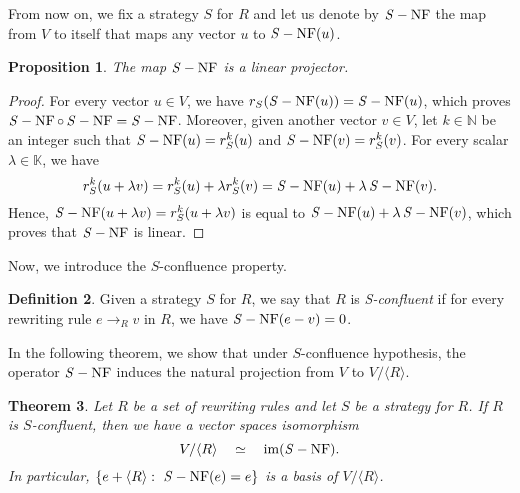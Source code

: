 \documentclass[11pt]{article}
\newtheorem{theorem}{Theorem}[section]
\newtheorem{proposition}[theorem]{Proposition}
\theoremstyle{definition}
\newtheorem{definition}[theorem]{Definition}
\newcommand\K{\mathbb{K}}
\newcommand\N{\mathbb{N}}
\newcommand\Span[1]{\langle #1\rangle}
\DeclareMathOperator{\im}{im}
\newcommand\rewR{\to_R}
\DeclareMathOperator{\SNF}{{\it S}-NF}
\begin{document}
From now on, we fix a strategy $S$ for $R$ and let us denote by $\SNF$
the map from $V$ to itself that maps any vector $u$ to $\SNF(u)$.
\smallskip

\begin{proposition}\label{prop:SNF_projector}
  The map $\SNF$ is a linear projector.
\end{proposition}

\begin{proof}
  For every vector $u\in V$, we have $r_S(\SNF(u))=\SNF(u)$, which proves 
  $\SNF\circ\SNF=\SNF$. Moreover, given another vector $v\in V$, let
  $k\in\N$ be an integer such that $\SNF(u)=r_S^k(u)$ and
  $\SNF(v)=r_S^k(v)$. For every scalar $\lambda\in\K$, we have 
  \[r^k_S(u+\lambda v)=r^k_S(u)+\lambda r^k_S(v)=\SNF(u)+\lambda\SNF(v).
  \]
  Hence, $\SNF(u+\lambda v)=r^k_S(u+\lambda v)$ is equal to
  $\SNF(u)+\lambda\SNF(v)$, which proves that $\SNF$ is linear.
\end{proof}

\smallskip

Now, we introduce the $S$-confluence property. 
\smallskip

\begin{definition}\label{def:standardisation_property}
  Given a strategy $S$ for $R$, we say that $R$ is \emph{S-confluent} if
  for every rewriting rule $e\rewR v$ in $R$, we have $\SNF(e-v)=0$.
\end{definition}
\smallskip

In the following theorem, we show that under $S$-confluence hypothesis,
the operator $\SNF$ induces the natural projection from $V$ to
$V/\Span{R}$.
\medskip

\begin{theorem}\label{thm:SNF_decompo}
  Let $R$ be a set of rewriting rules and let $S$ be a strategy for $R$.
  If $R$ is $S$-confluent, then we have a vector spaces isomorphism
  \begin{equation}\label{equ:iso_SNF}
    V/\Span{R}\quad\simeq\quad\im(\SNF).
  \end{equation}
  In particular, $\{e+\Span{R}:\ \SNF(e)=e\}$ is a basis of
  $V/\Span{R}$.
\end{theorem}
\end{document}
